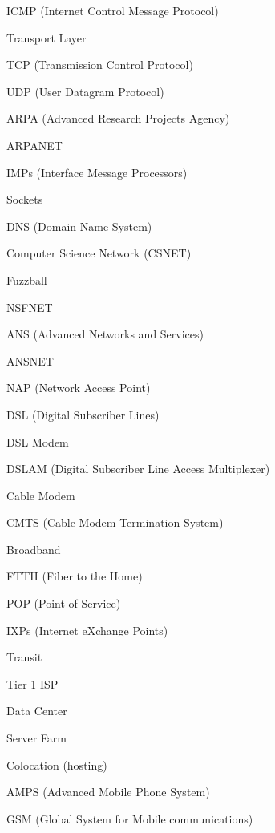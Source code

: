 \filbreak
\vskip 3mm
ICMP (Internet Control Message Protocol)

\filbreak
\vskip 3mm
Transport Layer

\filbreak
\vskip 3mm
TCP (Transmission Control Protocol)

\filbreak
\vskip 3mm
UDP (User Datagram Protocol)

\filbreak
\vskip 3mm
ARPA (Advanced Research Projects Agency)

\filbreak
\vskip 3mm
ARPANET

\filbreak
\vskip 3mm
IMPs (Interface Message Processors)

\filbreak
\vskip 3mm
Sockets

\filbreak
\vskip 3mm
DNS (Domain Name System)

\filbreak
\vskip 3mm
Computer Science Network (CSNET)

\filbreak
\vskip 3mm
Fuzzball

\filbreak
\vskip 3mm
NSFNET

\filbreak
\vskip 3mm
ANS (Advanced Networks and Services)

\filbreak
\vskip 3mm
ANSNET

\filbreak
\vskip 3mm
NAP (Network Access Point)

\filbreak
\vskip 3mm
DSL (Digital Subscriber Lines)

\filbreak
\vskip 3mm
DSL Modem

\filbreak
\vskip 3mm
DSLAM (Digital Subscriber Line Access Multiplexer)

\filbreak
\vskip 3mm
Cable Modem

\filbreak
\vskip 3mm
CMTS (Cable Modem Termination System)

\filbreak
\vskip 3mm
Broadband

\filbreak
\vskip 3mm
FTTH (Fiber to the Home)

\filbreak
\vskip 3mm
POP (Point of Service)

\filbreak
\vskip 3mm
IXPs (Internet eXchange Points)

\filbreak
\vskip 3mm
Transit

\filbreak
\vskip 3mm
Tier 1 ISP

\filbreak
\vskip 3mm
Data Center

\filbreak
\vskip 3mm
Server Farm

\filbreak
\vskip 3mm
Colocation (hosting)

\filbreak
\vskip 3mm
AMPS (Advanced Mobile Phone System)

\filbreak
\vskip 3mm
GSM (Global System for Mobile communications)

